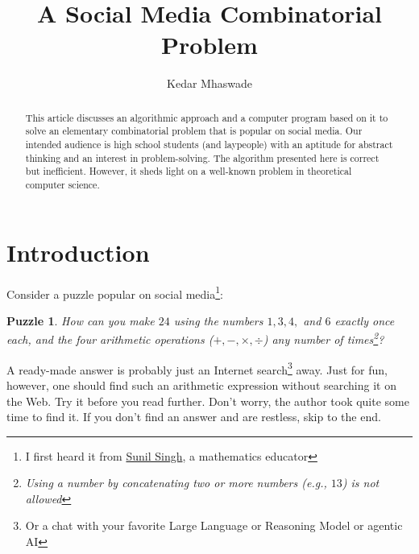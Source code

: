 \documentclass[english,smartquotes]{hgbarticle}
\newtheorem{question}{Puzzle}
\begin{document}

\author{
	Kedar Mhaswade\\ 
}
\title{A Social Media Combinatorial Problem}
\date{}

\maketitle

\begin{abstract}\noindent
This article discusses an algorithmic approach and a computer program based on it to solve an elementary combinatorial problem that is popular on social media. Our intended audience is high school students (and laypeople) with an aptitude for abstract thinking and an interest in problem-solving. The algorithm presented here is correct but inefficient. However, it sheds light on a well-known problem in theoretical computer science.
\end{abstract}


\section{Introduction}

Consider a puzzle popular on social media\footnote{I first heard it from \href{https://sunilsingh-42118.medium.com/}{Sunil Singh}, a mathematics educator}:

\begin{question}
\label{puzzle1}
How can you make $24$ using the numbers $1, 3, 4,$ and $6$ exactly once each, and the four arithmetic operations ($+, -, \times, \div$) any number of times\footnote{Using a number by concatenating two or more numbers (e.g., $13$) is not allowed}?
\end{question}

A ready-made answer is probably just an Internet search\footnote{Or a chat with your favorite Large Language or Reasoning Model or agentic AI} away. Just for fun, however, one should find such an arithmetic expression without searching it on the Web. Try it before you read further. Don't worry, the author took quite some time to find it. If you don't find an answer and are restless, skip to the end.
\end{document}
